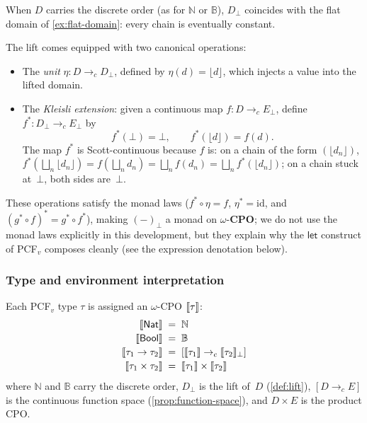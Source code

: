 When $D$ carries the discrete order (as for $\mathbb{N}$ or
$\mathbb{B}$), $D_\bot$ coincides with the flat domain of
\cref{ex:flat-domain}: every chain is eventually constant.

The lift comes equipped with two canonical operations:
\begin{itemize}
  \item The \emph{unit} $\eta : D \to_c D_\bot$, defined by
    $\eta(d) = \lfloor d \rfloor$, which injects a value into the
    lifted domain.
  \item The \emph{Kleisli extension}: given a continuous map
    $f : D \to_c E_\bot$, define $f^\ast : D_\bot \to_c E_\bot$ by
    \[
      f^\ast(\bot) = \bot, \qquad
      f^\ast(\lfloor d \rfloor) = f(d).
    \]
    The map $f^\ast$ is Scott-continuous because $f$ is: on a chain
    of the form $(\lfloor d_n \rfloor)$, $f^\ast(\bigsqcup_n
    \lfloor d_n \rfloor) = f(\bigsqcup_n d_n) = \bigsqcup_n f(d_n)
    = \bigsqcup_n f^\ast(\lfloor d_n \rfloor)$; on a chain stuck
    at~$\bot$, both sides are~$\bot$.
\end{itemize}

These operations satisfy the monad laws ($f^\ast \circ \eta = f$,
$\eta^\ast = \mathrm{id}$, and $(g^\ast \circ f)^\ast = g^\ast \circ
f^\ast$), making $(-)_\bot$ a monad on $\omega$-$\mathbf{CPO}$; we do
not use the monad laws explicitly in this development, but they
explain why the $\mathsf{let}$ construct of PCF$_v$ composes cleanly
(see the expression denotation below).

\subsubsection*{Type and environment interpretation}

\begin{definition}
\label{def:type-interpretation}
Each PCF$_v$ type $\tau$ is assigned an $\omega$-CPO $\llbracket \tau \rrbracket$:
\[
\begin{array}{r@{\;\;=\;\;}l}
  \sem{\Nat}               & \mathbb{N} \\[2pt]
  \sem{\Bool}              & \mathbb{B} \\[2pt]
  \sem{\tau_1 \to \tau_2}  & [\sem{\tau_1} \to_c \sem{\tau_2}_\bot] \\[2pt]
  \sem{\tau_1 \times \tau_2} & \sem{\tau_1} \times \sem{\tau_2}
\end{array}
\]
where $\mathbb{N}$ and $\mathbb{B}$ carry the discrete order, $D_\bot$
is the lift of~$D$ (\cref{def:lift}), $[D \to_c E]$ is the
continuous function space (\cref{prop:function-space}), and $D \times E$
is the product CPO.
\end{definition}

